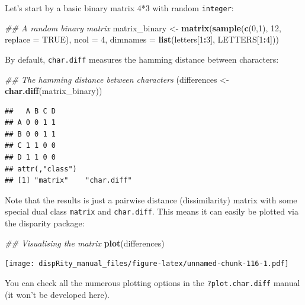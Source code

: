 \documentclass[]{book}
\newenvironment{Shaded}{\begin{snugshade}}{\end{snugshade}}
\newcommand{\CommentTok}[1]{\textcolor[rgb]{0.56,0.35,0.01}{\textit{#1}}}
\newcommand{\DataTypeTok}[1]{\textcolor[rgb]{0.13,0.29,0.53}{#1}}
\newcommand{\DecValTok}[1]{\textcolor[rgb]{0.00,0.00,0.81}{#1}}
\newcommand{\KeywordTok}[1]{\textcolor[rgb]{0.13,0.29,0.53}{\textbf{#1}}}
\newcommand{\NormalTok}[1]{#1}
\newcommand{\OperatorTok}[1]{\textcolor[rgb]{0.81,0.36,0.00}{\textbf{#1}}}
\newcommand{\OtherTok}[1]{\textcolor[rgb]{0.56,0.35,0.01}{#1}}
\newcommand{\StringTok}[1]{\textcolor[rgb]{0.31,0.60,0.02}{#1}}
\begin{document}
Let's start by a basic binary matrix 4*3 with random \texttt{integer}:

\begin{Shaded}
\begin{Highlighting}[]
\CommentTok{## A random binary matrix}
\NormalTok{matrix_binary <-}\StringTok{ }\KeywordTok{matrix}\NormalTok{(}\KeywordTok{sample}\NormalTok{(}\KeywordTok{c}\NormalTok{(}\DecValTok{0}\NormalTok{,}\DecValTok{1}\NormalTok{), }\DecValTok{12}\NormalTok{, }\DataTypeTok{replace =} \OtherTok{TRUE}\NormalTok{), }\DataTypeTok{ncol =} \DecValTok{4}\NormalTok{,}
                        \DataTypeTok{dimnames =} \KeywordTok{list}\NormalTok{(letters[}\DecValTok{1}\OperatorTok{:}\DecValTok{3}\NormalTok{], LETTERS[}\DecValTok{1}\OperatorTok{:}\DecValTok{4}\NormalTok{]))}
\end{Highlighting}
\end{Shaded}

By default, \texttt{char.diff} measures the hamming distance between characters:

\begin{Shaded}
\begin{Highlighting}[]
\CommentTok{## The hamming distance between characters}
\NormalTok{(differences <-}\StringTok{ }\KeywordTok{char.diff}\NormalTok{(matrix_binary))}
\end{Highlighting}
\end{Shaded}

\begin{verbatim}
##   A B C D
## A 0 0 1 1
## B 0 0 1 1
## C 1 1 0 0
## D 1 1 0 0
## attr(,"class")
## [1] "matrix"    "char.diff"
\end{verbatim}

Note that the results is just a pairwise distance (dissimilarity) matrix with some special dual class \texttt{matrix} and \texttt{char.diff}.
This means it can easily be plotted via the disparity package:

\begin{Shaded}
\begin{Highlighting}[]
\CommentTok{## Visualising the matrix}
\KeywordTok{plot}\NormalTok{(differences)}
\end{Highlighting}
\end{Shaded}

\texttt{[image: dispRity\_manual\_files/figure-latex/unnamed-chunk-116-1.pdf]}

You can check all the numerous plotting options in the \texttt{?plot.char.diff} manual (it won't be developed here).
\end{document}
